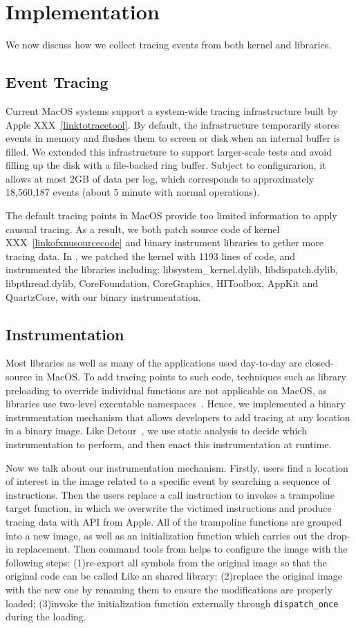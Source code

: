 \section{Implementation}\label{sec:implementation}
We now discuss how we collect tracing events from both kernel and libraries.

\subsection{Event Tracing}
Current MacOS systems support a system-wide tracing infrastructure built by
Apple XXX~\ref{linktotracetool}. By default, the infrastructure temporarily stores
events in memory and flushes them to screen or disk when an internal buffer is
filled. We extended this infrastructure to support larger-scale tests and avoid
filling up the disk with a file-backed ring buffer. Subject to configurarion,
it allows at most 2GB of data per log, which corresponds to approximately
18,560,187 events (about 5 minute with normal operations).

The default tracing points in MacOS provide too limited information to
apply causual tracing. As a result, we both patch source code of kernel
XXX~\ref{linkofxnusourcecode} and binary instrument libraries to gether
more tracing data. In \xxx, we patched the kernel with 1193 lines of
code, and instrumented the libraries including: libsystem\_kernel.dylib,
libdispatch.dylib, libpthread.dylib, CoreFoundation, CoreGraphics, HIToolbox,
AppKit and QuartzCore, with our binary instrumentation.

\subsection{Instrumentation}
Most libraries as well as many of the applications used day-to-day are
closed-source in MacOS. To add tracing points to such code, techniques such as
library preloading to override individual functions are not applicable on MacOS,
as libraries use two-level executable namespaces~\cite{}. Hence, we implemented
a binary instrumentation mechanism that allows developers to add tracing at
any location in a binary image. Like Detour~\cite{hunt1999detours}, we use
static analysis to decide which instrumentation to perform, and then enact this
instrumentation at runtime.

Now we talk about our instrumentation mechanism. Firstly, users find a location
of interest in the image related to a specific event by searching a sequence of
instructions. Then the users replace a call instruction to invokes a trampoline
target function, in which we overwrite the victimed instructions and produce
tracing data with API from Apple. All of the trampoline functions are grouped
into a new image, as well as an initialization function which carries out the
drop-in replacement. Then command tools from \xxx helps to configure the image
with the following steps: (1)re-export all symbols from the original image so
that the original code can be called Like an shared library; (2)replace the
original image with the new one by renaming them to ensure the modifications
are properly loaded; (3)invoke the initialization function externally through
\texttt{dispatch\_once} during the loading.

